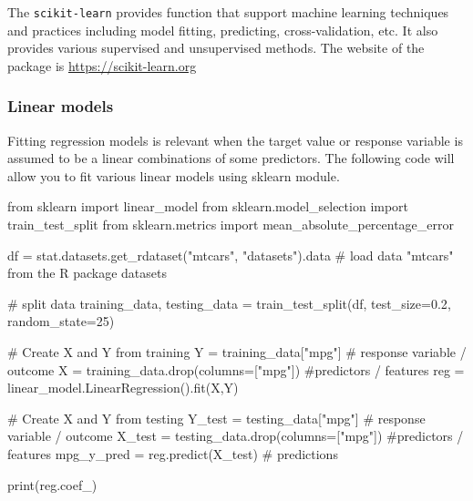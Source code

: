 \documentclass[
  letterpaper,
  DIV=11,
  numbers=noendperiod]{scrreprt}
\newenvironment{Shaded}{\begin{snugshade}}{\end{snugshade}}
\newcommand{\BuiltInTok}[1]{\textcolor[rgb]{0.00,0.23,0.31}{#1}}
\newcommand{\CommentTok}[1]{\textcolor[rgb]{0.37,0.37,0.37}{#1}}
\newcommand{\DecValTok}[1]{\textcolor[rgb]{0.68,0.00,0.00}{#1}}
\newcommand{\FloatTok}[1]{\textcolor[rgb]{0.68,0.00,0.00}{#1}}
\newcommand{\ImportTok}[1]{\textcolor[rgb]{0.00,0.46,0.62}{#1}}
\newcommand{\NormalTok}[1]{\textcolor[rgb]{0.00,0.23,0.31}{#1}}
\newcommand{\OperatorTok}[1]{\textcolor[rgb]{0.37,0.37,0.37}{#1}}
\newcommand{\StringTok}[1]{\textcolor[rgb]{0.13,0.47,0.30}{#1}}
\begin{document}

The \texttt{scikit-learn} provides function that support machine
learning techniques and practices including model fitting, predicting,
cross-validation, etc. It also provides various supervised and
unsupervised methods. The website of the package is
\url{https://scikit-learn.org}

\hypertarget{linear-models}{%
\subsubsection*{Linear models}\label{linear-models}}

Fitting regression models is relevant when the target value or response
variable is assumed to be a linear combinations of some predictors. The
following code will allow you to fit various linear models using sklearn
module.

\begin{Shaded}
\begin{Highlighting}[]
\ImportTok{from}\NormalTok{ sklearn }\ImportTok{import}\NormalTok{ linear\_model}
\ImportTok{from}\NormalTok{ sklearn.model\_selection }\ImportTok{import}\NormalTok{ train\_test\_split}
\ImportTok{from}\NormalTok{ sklearn.metrics }\ImportTok{import}\NormalTok{ mean\_absolute\_percentage\_error}

\NormalTok{df }\OperatorTok{=}\NormalTok{ stat.datasets.get\_rdataset(}\StringTok{"mtcars"}\NormalTok{, }\StringTok{"datasets"}\NormalTok{).data }\CommentTok{\# load data "mtcars" from the R package \textquotesingle{}datasets\textquotesingle{}}

\CommentTok{\# split data}
\NormalTok{training\_data, testing\_data }\OperatorTok{=}\NormalTok{ train\_test\_split(df, test\_size}\OperatorTok{=}\FloatTok{0.2}\NormalTok{, random\_state}\OperatorTok{=}\DecValTok{25}\NormalTok{)}

\CommentTok{\# Create X and Y from training}
\NormalTok{Y }\OperatorTok{=}\NormalTok{ training\_data[}\StringTok{"mpg"}\NormalTok{] }\CommentTok{\# response variable / outcome}
\NormalTok{X }\OperatorTok{=}\NormalTok{ training\_data.drop(columns}\OperatorTok{=}\NormalTok{[}\StringTok{"mpg"}\NormalTok{]) }\CommentTok{\#predictors / features}
\NormalTok{reg }\OperatorTok{=}\NormalTok{  linear\_model.LinearRegression().fit(X,Y)}

\CommentTok{\# Create X and Y from testing}
\NormalTok{Y\_test }\OperatorTok{=}\NormalTok{ testing\_data[}\StringTok{"mpg"}\NormalTok{] }\CommentTok{\# response variable / outcome}
\NormalTok{X\_test }\OperatorTok{=}\NormalTok{ testing\_data.drop(columns}\OperatorTok{=}\NormalTok{[}\StringTok{"mpg"}\NormalTok{]) }\CommentTok{\#predictors / features}
\NormalTok{mpg\_y\_pred }\OperatorTok{=}\NormalTok{ reg.predict(X\_test) }\CommentTok{\# predictions}

\BuiltInTok{print}\NormalTok{(reg.coef\_)}
\end{Highlighting}
\end{Shaded}
\end{document}

